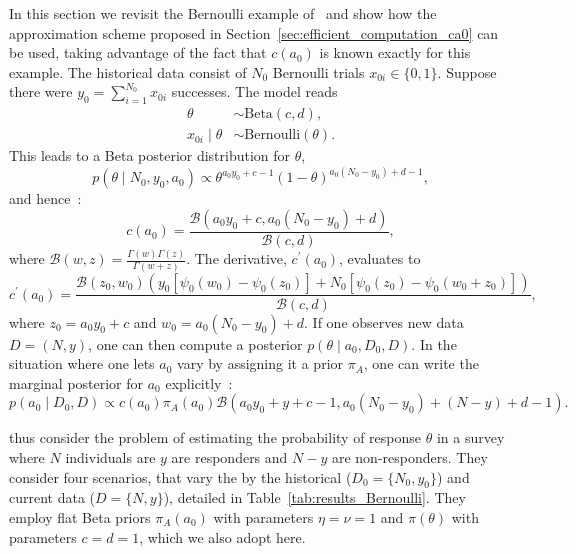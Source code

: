 \documentclass[a4paper, notitlepage, 11pt]{article}
\begin{document}
In this section we revisit the Bernoulli example of~\cite{Neuenschwander2009} and show how the approximation scheme proposed in Section~\ref{sec:efficient_computation_ca0} can be used, taking advantage of the fact that $c(a_0)$ is known exactly for this example.
The historical data consist of $N_0$ Bernoulli trials $x_{0i} \in \{0,1\}$.
Suppose there were $y_0 = \sum_{i=1}^{N_0}x_{0i}$ successes.
The model reads
\begin{align*}
 \theta &\sim \text{Beta}(c, d), \\
 x_{0i} \mid \theta &\sim \text{Bernoulli}(\theta).
\end{align*}
This leads to a Beta posterior distribution for $\theta$,
\begin{equation}
 \label{eq:bernoulli_posterior}
 p(\theta \mid N_0, y_0, a_0) \propto \theta ^{a_0 y_0 + c - 1} (1-\theta)^{a_0 (N_0 -y_0) + d - 1},
\end{equation}
and hence~\citep{Neuenschwander2009}:
\begin{equation}
 \label{eq:cA0_bernoulli}
 c(a_0) = \frac{\mathcal{B}(a_0 y_0 + c, a_0 (N_0 -y_0) + d)}{\mathcal{B}(c, d)},
\end{equation}
where $\mathcal{B}(w, z) = \frac{\Gamma(w)\Gamma(z)}{\Gamma(w + z)}$.
The derivative, $c^\prime(a_0)$, evaluates to
\begin{equation}
  \label{eq:cA0_prime_bernoulli}
c^\prime(a_0) = \frac{\mathcal{B}(z_0, w_0) \left(y_0 \left[\psi_0(w_0) - \psi_0(z_0) \right] + N_0 \left[ \psi_0(z_0) - \psi_0(w_0 + z_0) \right] \right) }{\mathcal{B}(c, d)},
\end{equation}
where $z_0 = a_0 y_0 + c $ and $w_0 = a_0 (N_0 -y_0) + d$.
If one observes new data $D = (N, y) $, one can then compute a posterior $p(\theta \mid a_0, D_0, D)$.
In the situation where one lets $a_0$ vary by assigning it a prior $\pi_A$, one can write the marginal posterior for $a_0$ explicitly~\cite[Eq. 8]{Neuenschwander2009}:
\begin{equation}
 \label{eq:marginal_posterior_a0_Bernoulli}
 p(a_0 \mid D_0, D) \propto c(a_0) \pi_A(a_0) \mathcal{B}(a_0 y_0 + y  + c -1, a_0(N_0-y_0) + (N -y) + d -1 ).
\end{equation}

\cite{Neuenschwander2009} thus consider the problem of estimating the probability of response $\theta$ in a survey where $N$ individuals are $y$ are responders and $N -y$ are non-responders.
They consider four scenarios, that vary the by the historical ($D_0 = \{N_0, y_0\}$) and current data ($D = \{N, y\}$), detailed in Table~\ref{tab:results_Bernoulli}.
They employ flat Beta priors $\pi_A(a_0)$ with parameters $\eta = \nu = 1$ and $\pi(\theta)$ with parameters $c = d = 1$, which we also adopt here.
\end{document}
